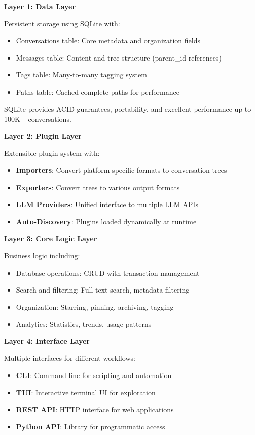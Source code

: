 \documentclass[11pt,letterpaper]{article}
\begin{document}
\textbf{Layer 1: Data Layer}

Persistent storage using SQLite with:
\begin{itemize}
    \item Conversations table: Core metadata and organization fields
    \item Messages table: Content and tree structure (parent\_id references)
    \item Tags table: Many-to-many tagging system
    \item Paths table: Cached complete paths for performance
\end{itemize}

SQLite provides ACID guarantees, portability, and excellent performance up to 100K+ conversations.

\textbf{Layer 2: Plugin Layer}

Extensible plugin system with:
\begin{itemize}
    \item \textbf{Importers}: Convert platform-specific formats to conversation trees
    \item \textbf{Exporters}: Convert trees to various output formats
    \item \textbf{LLM Providers}: Unified interface to multiple LLM APIs
    \item \textbf{Auto-Discovery}: Plugins loaded dynamically at runtime
\end{itemize}

\textbf{Layer 3: Core Logic Layer}

Business logic including:
\begin{itemize}
    \item Database operations: CRUD with transaction management
    \item Search and filtering: Full-text search, metadata filtering
    \item Organization: Starring, pinning, archiving, tagging
    \item Analytics: Statistics, trends, usage patterns
\end{itemize}

\textbf{Layer 4: Interface Layer}

Multiple interfaces for different workflows:
\begin{itemize}
    \item \textbf{CLI}: Command-line for scripting and automation
    \item \textbf{TUI}: Interactive terminal UI for exploration
    \item \textbf{REST API}: HTTP interface for web applications
    \item \textbf{Python API}: Library for programmatic access
\end{itemize}
\end{document}
